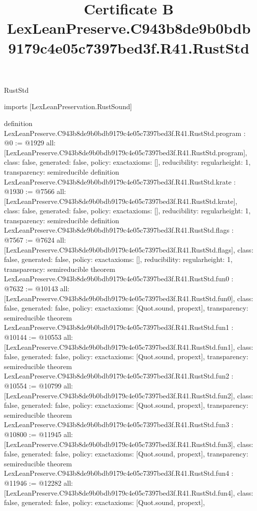 \begin{lexlean}{RustStd}
\title{Certificate B LexLeanPreserve.C943b8de9b0bdb9179c4e05c7397bed3f.R41.RustStd}
\begin{coremodule}
imports [LexLeanPreservation.RustSound]

definition LexLeanPreserve.C943b8de9b0bdb9179c4e05c7397bed3f.R41.RustStd.program : @0 := @1929 {
  all: [LexLeanPreserve.C943b8de9b0bdb9179c4e05c7397bed3f.R41.RustStd.program],
  class: false,
  generated: false,
  policy: exact{axioms: []},
  reducibility: regular{height: 1},
  transparency: semireducible
}
definition LexLeanPreserve.C943b8de9b0bdb9179c4e05c7397bed3f.R41.RustStd.krate : @1930 := @7566 {
  all: [LexLeanPreserve.C943b8de9b0bdb9179c4e05c7397bed3f.R41.RustStd.krate],
  class: false,
  generated: false,
  policy: exact{axioms: []},
  reducibility: regular{height: 1},
  transparency: semireducible
}
definition LexLeanPreserve.C943b8de9b0bdb9179c4e05c7397bed3f.R41.RustStd.flags : @7567 := @7624 {
  all: [LexLeanPreserve.C943b8de9b0bdb9179c4e05c7397bed3f.R41.RustStd.flags],
  class: false,
  generated: false,
  policy: exact{axioms: []},
  reducibility: regular{height: 1},
  transparency: semireducible
}
theorem LexLeanPreserve.C943b8de9b0bdb9179c4e05c7397bed3f.R41.RustStd.fun0 : @7632 := @10143 {
  all: [LexLeanPreserve.C943b8de9b0bdb9179c4e05c7397bed3f.R41.RustStd.fun0],
  class: false,
  generated: false,
  policy: exact{axioms: [Quot.sound, propext]},
  transparency: semireducible
}
theorem LexLeanPreserve.C943b8de9b0bdb9179c4e05c7397bed3f.R41.RustStd.fun1 : @10144 := @10553 {
  all: [LexLeanPreserve.C943b8de9b0bdb9179c4e05c7397bed3f.R41.RustStd.fun1],
  class: false,
  generated: false,
  policy: exact{axioms: [Quot.sound, propext]},
  transparency: semireducible
}
theorem LexLeanPreserve.C943b8de9b0bdb9179c4e05c7397bed3f.R41.RustStd.fun2 : @10554 := @10799 {
  all: [LexLeanPreserve.C943b8de9b0bdb9179c4e05c7397bed3f.R41.RustStd.fun2],
  class: false,
  generated: false,
  policy: exact{axioms: [Quot.sound, propext]},
  transparency: semireducible
}
theorem LexLeanPreserve.C943b8de9b0bdb9179c4e05c7397bed3f.R41.RustStd.fun3 : @10800 := @11945 {
  all: [LexLeanPreserve.C943b8de9b0bdb9179c4e05c7397bed3f.R41.RustStd.fun3],
  class: false,
  generated: false,
  policy: exact{axioms: [Quot.sound, propext]},
  transparency: semireducible
}
theorem LexLeanPreserve.C943b8de9b0bdb9179c4e05c7397bed3f.R41.RustStd.fun4 : @11946 := @12282 {
  all: [LexLeanPreserve.C943b8de9b0bdb9179c4e05c7397bed3f.R41.RustStd.fun4],
  class: false,
  generated: false,
  policy: exact{axioms: [Quot.sound, propext]},
}
\end{coremodule}
\end{lexlean}
